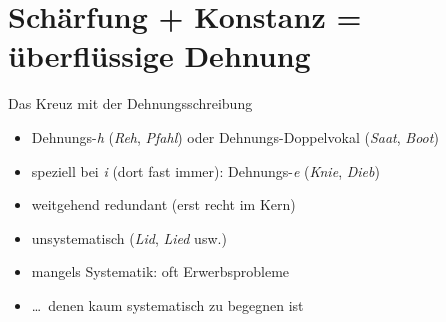\section{Schärfung + Konstanz = überflüssige Dehnung}

\begin{frame}
  {Das Kreuz mit der Dehnungsschreibung}
  \pause
  \begin{itemize}[<+->]
    \item Dehnungs-\textit{h} (\textit{Reh}, \textit{Pfahl}) oder Dehnungs-Doppelvokal (\textit{Saat}, \textit{Boot})
    \item speziell bei \textit{i} (dort fast immer): Dehnungs-\textit{e} (\textit{Knie}, \textit{Dieb})
      \Halbzeile
    \item \alert{weitgehend redundant} (erst recht im Kern)
    \item \alert{unsystematisch} (\textit{Lid}, \textit{Lied} usw.)
      \Halbzeile
    \item mangels Systematik: \alert{oft Erwerbsprobleme}
    \item \ldots\ denen kaum systematisch zu begegnen ist
  \end{itemize}
\end{frame}

